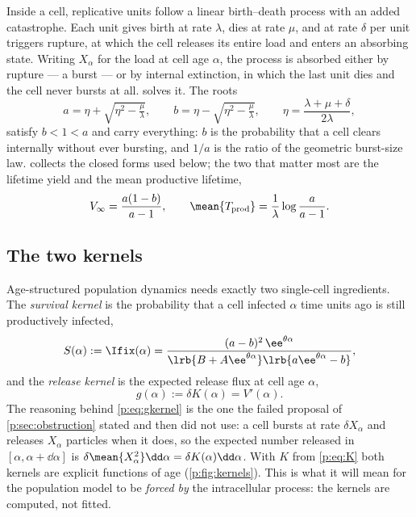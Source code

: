 Inside a cell, replicative units follow a linear birth--death process with
an added catastrophe. Each unit gives birth at rate $\lambda$, dies at rate
$\mu$, and at rate $\delta$ per unit triggers rupture, at which the cell
releases its entire load and enters an absorbing state. Writing $X_\alpha$
for the load at cell age $\alpha$, the process is absorbed either by
rupture --- a burst --- or by internal extinction, in which the last unit
dies and the cell never bursts at all. \ChCorecap{} solves it. The roots
\begin{equation}
a=\eta+\sqrt{\eta^2-\tfrac{\mu}{\lambda}},\qquad
b=\eta-\sqrt{\eta^2-\tfrac{\mu}{\lambda}},\qquad
\eta=\frac{\lambda+\mu+\delta}{2\lambda},
\label{p:eq:roots}
\end{equation}
satisfy $b<1<a$ and carry everything: $b$ is the probability that a cell
clears internally without ever bursting, and $1/a$ is the ratio of the
geometric burst-size law.  collects the closed forms used
below; the two that matter most are the lifetime yield and the mean
productive lifetime,
\begin{equation}
V_\infty=\frac{a(1-b)}{a-1},
\qquad
\mean{T_{\rm prod}}=\frac{1}{\lambda}\log\frac{a}{a-1}.
\label{p:eq:Vinf-Tprod}
\end{equation}

\subsection{The two kernels}

Age-structured population dynamics needs exactly two single-cell
ingredients. The \emph{survival kernel} is the probability that a cell
infected $\alpha$ time units ago is still productively infected,
\begin{equation}
S(\alpha):=\Ifix(\alpha)=\frac{(a-b)^2\,\ee^{\theta\alpha}}
{\lrb{B+A\ee^{\theta\alpha}}\lrb{a\ee^{\theta\alpha}-b}},
\label{p:eq:Skernel}
\end{equation}
and the \emph{release kernel} is the expected release flux at cell age
$\alpha$,
\begin{equation}
g(\alpha):=\delta K(\alpha)=V'(\alpha).
\label{p:eq:gkernel}
\end{equation}
The reasoning behind \cref{p:eq:gkernel} is the one the failed proposal of
\cref{p:sec:obstruction} stated and then did not use: a cell bursts at rate
$\delta X_\alpha$ and releases $X_\alpha$ particles when it does, so the
expected number released in $[\alpha,\alpha+\dd\alpha]$ is
$\delta\mean{X_\alpha^2}\dd\alpha=\delta K(\alpha)\dd\alpha$. With $K$ from
\cref{p:eq:K} both kernels are explicit functions of age
(\cref{p:fig:kernels}). This is what it will mean for the population model
to be \emph{forced by} the intracellular process: the kernels are computed,
not fitted.

